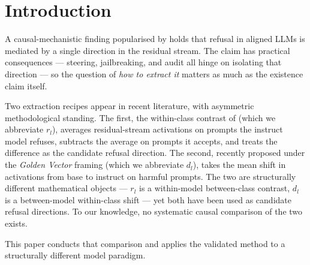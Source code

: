 \section{Introduction}
\label{sec:intro}

A causal-mechanistic finding popularised by \citet{arditi2024refusal}
holds that refusal in aligned LLMs is mediated by a single direction
in the residual stream. The claim has practical consequences ---
steering, jailbreaking, and audit all hinge on isolating that
direction --- so the question of \emph{how to extract it} matters as
much as the existence claim itself.

Two extraction recipes appear in recent literature, with asymmetric
methodological standing. The first, the within-class contrast of
\citet{arditi2024refusal} (which we abbreviate $r_l$), averages
residual-stream activations on prompts the instruct model refuses,
subtracts the average on prompts it accepts, and treats the difference
as the candidate refusal direction. The second, recently proposed
under the \emph{Golden Vector} framing
\citep{giordani2025golden} (which we abbreviate $d_l$), takes the
mean shift in activations from base to instruct on harmful prompts.
The two are structurally different mathematical objects --- $r_l$ is a
within-model between-class contrast, $d_l$ is a between-model
within-class shift --- yet both have been used as candidate refusal
directions. To our knowledge, no systematic causal comparison of the
two exists.

This paper conducts that comparison and applies the validated method
to a structurally different model paradigm.

